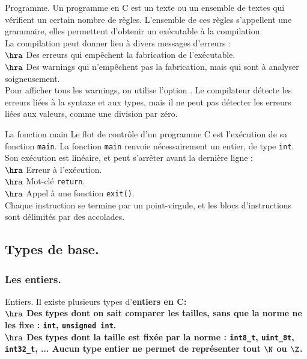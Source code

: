\documentclass[french, 11pt]{article}
\begin{document}
\begin{defi}{Programme.}{}
    Un programme en C est un texte ou un ensemble de textes qui vérifient un certain nombre de règles.
    L'ensemble de ces règles s'appellent une grammaire, elles permettent d'obtenir un exécutable à la compilation.\\
    La compilation peut donner lieu à divers messages d'erreurs :\\
    $\hra$ Des erreurs qui empêchent la fabrication de l'exécutable.\\
    $\hra$ Des warnings qui n'empêchent pas la fabrication, mais qui sont à analyser soigneusement.\\
    Pour afficher tous les warnings, on utilise l'option .\n
    Le compilateur détecte les erreurs liées à la syntaxe et aux types, mais il ne peut pas détecter les erreurs liées aux valeurs, comme une division par zéro.
\end{defi}

\begin{defi}{La fonction main}{}
    Le flot de contrôle d'un programme C est l'exécution de sa fonction \texttt{main}.\n
    La fonction \texttt{main} renvoie nécessairement un entier, de type \texttt{int}. Son exécution est linéaire, et peut s'arrêter avant la dernière ligne :\\
    $\hra$ Erreur à l'exécution.\\
    $\hra$ Mot-clé \texttt{return}.\\
    $\hra$ Appel à une fonction \texttt{exit()}.\\
    Chaque instruction se termine par un point-virgule, et les blocs d'instructions sont délimités par des accolades.
\end{defi}

\subsection{Types de base.}

\subsubsection{Les entiers.}

\begin{defi}{Entiers.}{}
    Il existe plusieurs types d'\bf{entiers} en C:\\
    $\hra$ Des types dont on sait comparer les tailles, sans que la norme ne les fixe : \texttt{int}, \texttt{unsigned int}.\\
    $\hra$ Des types dont la taille est fixée par la norme : \texttt{int8\_t}, \texttt{uint\_8t}, \texttt{int32\_t}, ...\n
    Aucun type entier ne permet de représenter tout $\N$ ou $\Z$.
\end{defi}
\end{document}

